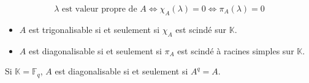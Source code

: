 
	\begin{proposition}
		\[ \lambda \text{ est valeur propre de } A \iff \chi_A(\lambda) = 0 \iff \pi_A(\lambda) = 0 \]
	\end{proposition}


	\begin{proposition}
		\begin{itemize}
			\item $A$ est trigonalisable si et seulement si $\chi_A$ est scindé sur $\mathbb{K}$.
			\item $A$ est diagonalisable si et seulement si $\pi_A$ est scindé à racines simples sur $\mathbb{K}$.
		\end{itemize}
	\end{proposition}

	\begin{remark}
		Si $\mathbb{K} = \mathbb{F}_q$, $A$ est diagonalisable si et seulement si $A^q = A$.
	\end{remark}

